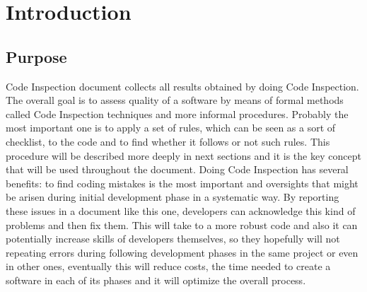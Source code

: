\newpage
\section{Introduction}
\subsection{Purpose}
Code Inspection document collects all results obtained by doing Code Inspection. The overall goal is to assess quality of a software by means of formal methods called Code Inspection techniques and more informal procedures. \newline
Probably the most important one is to apply a set of rules, which can be seen as a sort of checklist, to the code and to find whether it follows or not such rules. This procedure will be described more deeply in next sections and it is the key concept that will be used throughout the document. \newline
Doing Code Inspection has several benefits: to find coding mistakes is the most important and oversights that might be arisen during initial development phase in a systematic way. By reporting these issues in a document like this one, developers can acknowledge this kind of problems and then fix them. This will take to a more robust code and also it can potentially increase skills of developers themselves, so they hopefully will not repeating errors during following development phases in the same project or even in other ones, eventually this will reduce costs, the time needed to create a software in each of its phases and it will optimize the overall process.
